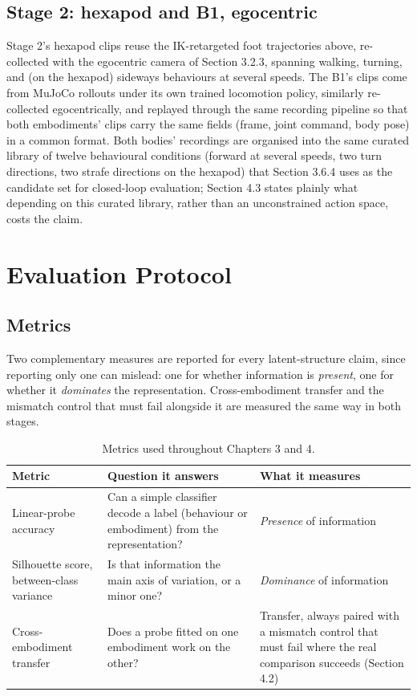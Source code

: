 \documentclass[12pt,a4paper,oneside]{report}
\begin{document}
\subsection{Stage 2: hexapod and B1, egocentric}
Stage 2's hexapod clips reuse the IK-retargeted foot trajectories above, re-collected with the egocentric camera
of Section 3.2.3, spanning walking, turning, and (on the hexapod) sideways behaviours at several speeds. The B1's
clips come from MuJoCo rollouts under its own trained locomotion policy, similarly re-collected egocentrically, and
replayed through the same recording pipeline so that both embodiments' clips carry the same fields (frame, joint
command, body pose) in a common format. Both bodies' recordings are organised into the same curated library of
twelve behavioural conditions (forward at several speeds, two turn directions, two strafe directions on the
hexapod) that Section 3.6.4 uses as the candidate set for closed-loop evaluation; Section 4.3 states plainly what
depending on this curated library, rather than an unconstrained action space, costs the claim.

\section{Evaluation Protocol}

\subsection{Metrics}
Two complementary measures are reported for every latent-structure claim, since reporting only one can mislead:
one for whether information is \emph{present}, one for whether it \emph{dominates} the representation.
Cross-embodiment transfer and the mismatch control that must fail alongside it are measured the same way in both
stages.

\begin{table}[H]
\centering
\footnotesize
\setlength{\tabcolsep}{4pt}
\caption{Metrics used throughout Chapters 3 and 4.}
\label{tab:metrics}
\begin{tabularx}{\textwidth}{>{\hsize}Y>{\hsize}Y>{\hsize}Y}
\hline
\textbf{Metric} & \textbf{Question it answers} & \textbf{What it measures}\\
\hline
Linear-probe accuracy & Can a simple classifier decode a label (behaviour or embodiment) from the
  representation? & \emph{Presence} of information\\
Silhouette score, between-class variance & Is that information the main axis of variation, or a minor one? &
  \emph{Dominance} of information\\
Cross-embodiment transfer & Does a probe fitted on one embodiment work on the other? & Transfer, always paired
  with a mismatch control that must fail where the real comparison succeeds (Section 4.2)\\
\hline
\end{tabularx}
\end{table}
\end{document}
